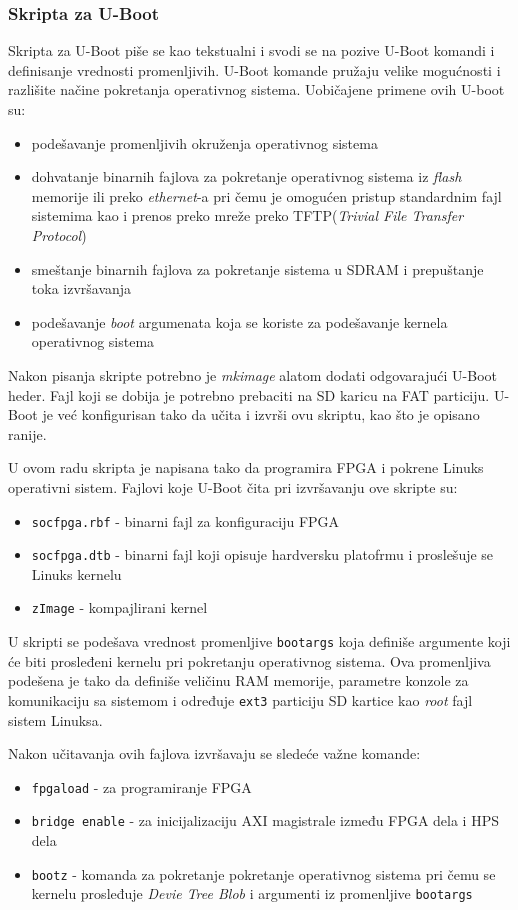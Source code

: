 \subsubsection{Skripta za U-Boot}
Skripta za U-Boot piše se kao tekstualni i svodi se na pozive U-Boot komandi i definisanje vrednosti promenljivih. U-Boot komande pružaju velike mogućnosti i razlišite načine pokretanja operativnog sistema. Uobičajene primene ovih U-boot su:
\begin{itemize}
\item podešavanje promenljivih okruženja operativnog sistema
\item dohvatanje binarnih fajlova za pokretanje operativnog sistema iz \textit{flash} memorije ili preko \textit{ethernet}-a pri čemu je omogućen pristup standardnim fajl sistemima kao i prenos preko mreže preko TFTP(\textit{Trivial File Transfer Protocol})
\item smeštanje binarnih fajlova za pokretanje sistema u SDRAM i prepuštanje toka izvršavanja
\item podešavanje \textit{boot} argumenata koja se koriste za podešavanje kernela operativnog sistema
\end{itemize}

Nakon pisanja skripte potrebno je \textit{mkimage} alatom dodati odgovarajući U-Boot heder. Fajl koji se dobija je potrebno prebaciti na SD karicu na FAT particiju. U-Boot je već konfigurisan tako da učita i izvrši ovu skriptu, kao što je opisano ranije.

U ovom radu skripta je napisana tako da programira FPGA i pokrene Linuks operativni sistem. Fajlovi koje U-Boot čita pri izvršavanju ove skripte su:
\begin{itemize}
\item \texttt{socfpga.rbf} - binarni fajl za konfiguraciju FPGA
\item \texttt{socfpga.dtb} - binarni fajl koji opisuje hardversku platofrmu i proslešuje se Linuks kernelu
\item \texttt{zImage} - kompajlirani kernel
\end{itemize}

U skripti se podešava vrednost promenljive \texttt{bootargs} koja definiše argumente koji će biti prosleđeni kernelu pri pokretanju operativnog sistema. Ova promenljiva podešena je tako da definiše veličinu RAM memorije, parametre konzole za komunikaciju sa sistemom i određuje \texttt{ext3} particiju SD kartice kao \textit{root} fajl sistem Linuksa.

Nakon učitavanja ovih fajlova izvršavaju se sledeće važne komande:
\begin{itemize}
\item \texttt{fpgaload} - za programiranje FPGA
\item \texttt{bridge enable} - za inicijalizaciju AXI magistrale između FPGA dela i HPS dela
\item \texttt{bootz} - komanda za pokretanje pokretanje operativnog sistema pri čemu se kernelu prosleđuje \textit{Devie Tree Blob} i argumenti iz promenljive \texttt{bootargs}
\end{itemize}

